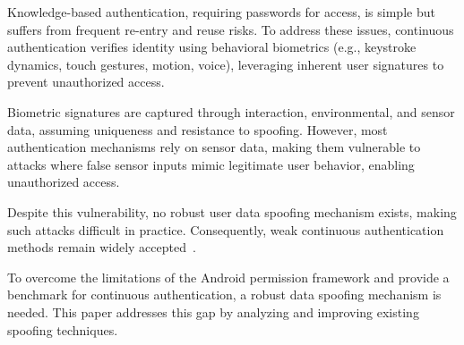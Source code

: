 % 
Knowledge-based authentication, requiring passwords for access, is simple but suffers from frequent re-entry and reuse risks. To address these issues, continuous authentication verifies identity using behavioral biometrics (e.g., keystroke dynamics, touch gestures, motion, voice), leveraging inherent user signatures to prevent unauthorized access.

Biometric signatures are captured through interaction, environmental, and sensor data, assuming uniqueness and resistance to spoofing. However, most authentication mechanisms rely on sensor data, making them vulnerable to attacks where false sensor inputs mimic legitimate user behavior, enabling unauthorized access.

Despite this vulnerability, no robust user data spoofing mechanism exists, making such attacks difficult in practice. Consequently, weak continuous authentication methods remain widely accepted~\cite{sun2018artificial, shih2015flick, jain2015exploring, feng2014tips, li2018using, yan2018towards, song2016eyeveri, xia2018motionhacker, hong2016mgra, johnson2013secure, zhu2013sensec, sitova2015hmog, pang2019mineauth, lee2017implicit}.

To overcome the limitations of the Android permission framework and provide a benchmark for continuous authentication, a robust data spoofing mechanism is needed. This paper addresses this gap by analyzing and improving existing spoofing techniques.
